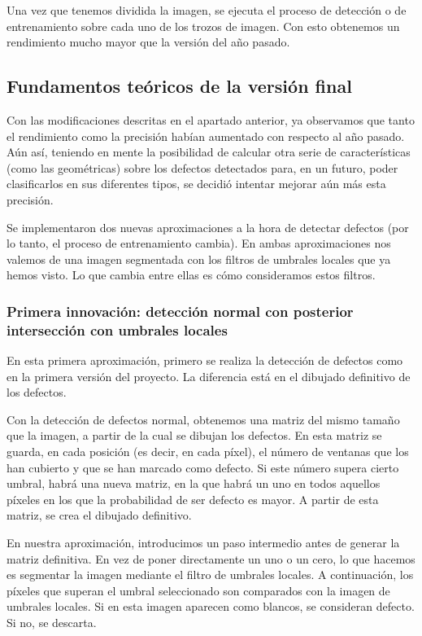 Una vez que tenemos dividida la imagen, se ejecuta el proceso de detección o de entrenamiento sobre cada uno de los trozos de imagen. Con esto obtenemos un rendimiento mucho mayor que la versión del año pasado.


\subsection{Fundamentos teóricos de la versión final}
Con las modificaciones descritas en el apartado anterior, ya observamos que tanto el rendimiento como la precisión habían aumentado con respecto al año pasado. Aún así, teniendo en mente la posibilidad de calcular otra serie de características (como las geométricas) sobre los defectos detectados para, en un futuro, poder clasificarlos en sus diferentes tipos, se decidió intentar mejorar aún más esta precisión.

Se implementaron dos nuevas aproximaciones a la hora de detectar defectos (por lo tanto, el proceso de entrenamiento cambia). En ambas aproximaciones nos valemos de una imagen segmentada con los filtros de umbrales locales que ya hemos visto. Lo que cambia entre ellas es cómo consideramos estos filtros.

\subsubsection{Primera innovación: detección normal con posterior intersección con umbrales locales}
En esta primera aproximación, primero se realiza la detección de defectos como en la primera versión del proyecto. La diferencia está en el dibujado definitivo de los defectos.

Con la detección de defectos normal, obtenemos una matriz del mismo tamaño que la imagen, a partir de la cual se dibujan los defectos. En esta matriz se guarda, en cada posición (es decir, en cada píxel), el número de ventanas que los han cubierto y que se han marcado como defecto. Si este número supera cierto umbral, habrá una nueva matriz, en la que habrá un uno en todos aquellos píxeles en los que la probabilidad de ser defecto es mayor. A partir de esta matriz, se crea el dibujado definitivo.

En nuestra aproximación, introducimos un paso intermedio antes de generar la matriz definitiva. En vez de poner directamente un uno o un cero, lo que hacemos es segmentar la imagen mediante el filtro de umbrales locales. A continuación, los píxeles que superan el umbral seleccionado son comparados con la imagen de umbrales locales. Si en esta imagen aparecen como blancos, se consideran defecto. Si no, se descarta.

